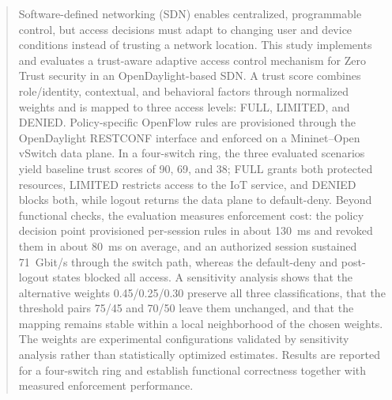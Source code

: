 %
%


\begin{abstract}
Software-defined networking (SDN) enables centralized, programmable control, but
access decisions must adapt to changing user and device conditions instead of
trusting a network location. This study implements and evaluates a trust-aware
adaptive access control mechanism for Zero Trust security in an
OpenDaylight-based SDN. A trust score combines role/identity, contextual, and
behavioral factors through normalized weights and is mapped to three access
levels: FULL, LIMITED, and DENIED. Policy-specific OpenFlow rules are
provisioned through the OpenDaylight RESTCONF interface and enforced on a
Mininet--Open vSwitch data plane. In a four-switch ring, the three evaluated
scenarios yield baseline trust scores of 90, 69, and 38; FULL grants both
protected resources, LIMITED restricts access to the IoT service, and DENIED
blocks both, while logout returns the data plane to default-deny. Beyond
functional checks, the evaluation measures enforcement cost: the policy decision
point provisioned per-session rules in about 130~ms and revoked them in about
80~ms on average, and an authorized session sustained 71~Gbit/s through the
switch path, whereas the default-deny and post-logout states blocked all access.
A sensitivity analysis shows that the alternative weights 0.45/0.25/0.30
preserve all three classifications, that the threshold pairs 75/45 and 70/50
leave them unchanged, and that the mapping remains stable within a local
neighborhood of the chosen weights. The weights are experimental configurations
validated by sensitivity analysis rather than statistically optimized estimates.
Results are reported for a four-switch ring and establish functional correctness
together with measured enforcement performance.
\end{abstract}


